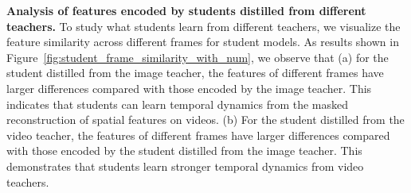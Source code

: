 \documentclass[10pt,twocolumn,letterpaper]{article}
\begin{document}
\begin{figure*}\centering
    \qquad
    \caption{\textbf{Feature similarity across different frames for different teacher models.} Similarity matrices are computed on the Kinetics-400 validation set. The numbers in the grid are the values of cosine similarity between two frame features. }\label{fig:teacher_frame_similarity_with_num}\end{figure*}

\begin{figure*}\centering
    \qquad
    \caption{\textbf{Feature similarity across different frames for student models distilled from different teacher models.} Similarity matrices are computed on the Kinetics-400 validation set.}\label{fig:student_frame_similarity_with_num}\end{figure*}

\noindent \textbf{Analysis of features encoded by students distilled from different teachers.} To study what students learn from different teachers, we visualize the feature similarity across different frames for student models. As results shown in Figure~\ref{fig:student_frame_similarity_with_num}, we observe that (a) for the student distilled from the image teacher, the features of different frames have larger differences compared with those encoded by the image teacher. This indicates that students can learn temporal dynamics from the masked reconstruction of spatial features on videos. (b) For the student distilled from the video teacher, the features of different frames have larger differences compared with those encoded by the student distilled from the image teacher. This demonstrates that students learn stronger temporal dynamics from video teachers.
\end{document}
